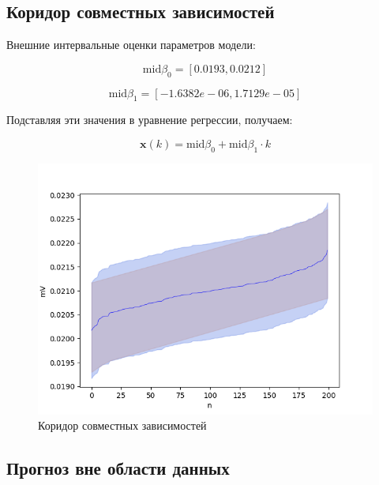 \FloatBarrier
\subsection{Коридор совместных зависимостей}

Внешние интервальные оценки параметров модели: 

\begin{equation*}
	\text{mid} \beta_0 = [0.0193, 0.0212]
\end{equation*}

\begin{equation*}
	\text{mid} \beta_1 = [-1.6382e-06, 1.7129e-05]
\end{equation*}

Подставляя эти значения в уравнение регрессии, получаем:

\begin{equation}
	\bm{x}(k) = \text{mid} \beta_0 + \text{mid} \beta_1 \cdot k
\end{equation}

\begin{figure}[ht]
	\begin{center}
		\includegraphics[scale = 0.55]{../images/corridor_of_joint_dependencies.png}
	\end{center}
	\caption{Коридор совместных зависимостей}
\end{figure}

\FloatBarrier

\subsection{Прогноз вне области данных}

